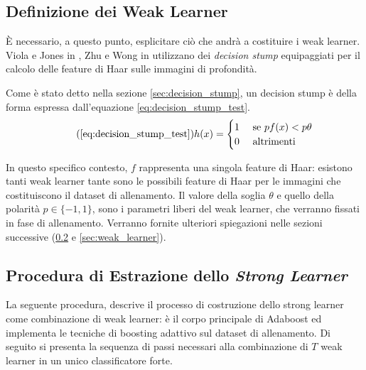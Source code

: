         \subsection{Definizione dei Weak Learner} %
        \label{sub:definizione_dei_weak_learner}
            È necessario, a questo punto, esplicitare ciò che andrà a costituire i weak learner.
            Viola e Jones in \cite{Viola04}, Zhu e Wong in \cite{Zhu13} utilizzano dei \emph{decision stump} equipaggiati per il calcolo delle feature di Haar sulle immagini di profondità.

            Come è stato detto nella sezione \ref{sec:decision_stump}, un decision stump è della forma espressa dall'equazione \ref{eq:decision_stump_test}.
            \begin{equation}
                \tag{\ref{eq:decision_stump_test}}
                h(x) = 
                \begin{cases}
                    1 & \text{ se } pf(x) < p\theta \\
                    0 & \text{ altrimenti }
                \end{cases}
            \end{equation}

            In questo specifico contesto, $f$ rappresenta una singola feature di Haar: esistono tanti weak learner tante sono le possibili feature di Haar per le immagini che costituiscono il dataset di allenamento.
            Il valore della soglia $\theta$ e quello della polarità $p \in \{-1,1\}$, sono i parametri liberi del weak learner, che verranno fissati in fase di allenamento.
            Verranno fornite ulteriori spiegazioni nelle sezioni successive (\ref{sub:strong_learner_extraction} e \ref{sec:weak_learner}).

        \subsection{Procedura di Estrazione dello \emph{Strong Learner}} %
        \label{sub:strong_learner_extraction}
            La seguente procedura, descrive il processo di costruzione dello strong learner come combinazione di weak learner: è il corpo principale di Adaboost ed implementa le tecniche di boosting adattivo sul dataset di allenamento.
            Di seguito si presenta la sequenza di passi necessari alla combinazione di $T$ weak learner in un unico classificatore forte.

